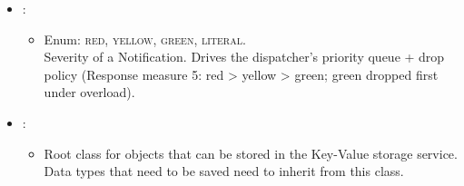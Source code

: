 \begin{itemize}[nolistsep,noitemsep]
\begin{itemize}[noitemsep,nolistsep]
\item[] Identifies one queued notification (used for ack/drop).
\end{itemize}

\item {}: 
\begin{itemize}[noitemsep,nolistsep]

\item[] Enum: \textsc{red}, \textsc{yellow}, \textsc{green}, \textsc{literal}.\\Severity of a Notification. Drives the dispatcher's priority queue + drop policy (Response measure 5: red \textgreater{} yellow \textgreater{} green; green dropped first under overload).
\end{itemize}

\item {}: 
\begin{itemize}[noitemsep,nolistsep]

\item[] Root class for objects that can be stored in the Key-Value storage service.
Data types that need to be saved need to inherit from this class.
\end{itemize}


\end{itemize}

